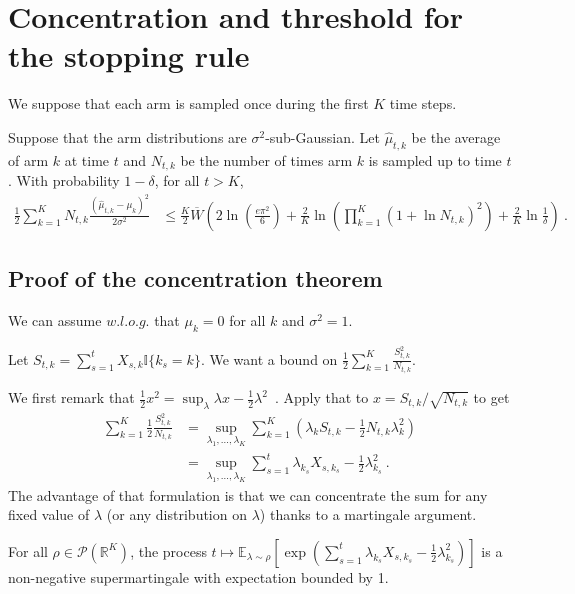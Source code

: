 

\section{Concentration and threshold for the stopping rule}
\label{app:concentration}

We suppose that each arm is sampled once during the first $K$ time steps.
\begin{theorem}
  \label{thm:bound_delta}
  Suppose that the arm distributions are $\sigma^2$-sub-Gaussian. Let $\hat{\mu}_{t,k}$ be the average of arm $k$ at time $t$ and $N_{t,k}$ be the number of times arm $k$ is sampled up to time $t$.
  With probability $1 - \delta$, for all $t > K$,
  \begin{align*}
  \frac{1}{2} \sum_{k=1}^K N_{t,k}\frac{(\hat{\mu}_{t,k}- \mu_k)^2}{2 \sigma^2}
  &\le \frac{K}{2} \overline{W}\left(2\ln \left(\frac{e\pi^2}{6}\right) + \frac{2}{K}\ln \left(\prod_{k=1}^K (1 + \ln N_{t,k})^2\right) + \frac{2}{K}\ln \frac{1}{\delta}\right)
  \: .
  \end{align*}
\end{theorem}



\subsection{Proof of the concentration theorem}

We can assume $w.l.o.g.$ that $\mu_k = 0$ for all $k$ and $\sigma^2 = 1$.

Let $S_{t,k} = \sum_{s=1}^t X_{s,k} \mathbb{I}\{k_s = k\}$.
We want a bound on $\frac{1}{2} \sum_{k=1}^K \frac{S_{t,k}^2}{N_{t,k}}$.


We first remark that $\frac{1}{2}x^2 = \sup_{\lambda} \lambda x - \frac{1}{2}\lambda^2$~. Apply that to $x = S_{t,k}/\sqrt{N_{t,k}}$ to get
\begin{align*}
\sum_{k=1}^K \frac{1}{2}\frac{S_{t,k}^2}{N_{t,k}}
&= \sup_{\lambda_1, \ldots, \lambda_K} \sum_{k=1}^K \left( \lambda_k S_{t,k} - \frac{1}{2}N_{t,k} \lambda_k^2 \right)
\\
&= \sup_{\lambda_1, \ldots, \lambda_K} \sum_{s=1}^t \lambda_{k_s}X_{s,k_s} - \frac{1}{2}\lambda_{k_s}^2
\: .
\end{align*}
The advantage of that formulation is that we can concentrate the sum for any fixed value of $\lambda$ (or any distribution on $\lambda$) thanks to a martingale argument.

\begin{lemma}
For all $\rho \in \mathcal P(\mathbb{R}^K)$, the process $t \mapsto \mathbb{E}_{\lambda \sim \rho}\left[\exp\left(\sum_{s=1}^t \lambda_{k_s}X_{s,k_s} - \frac{1}{2}\lambda_{k_s}^2\right)\right]$ is a non-negative supermartingale with expectation bounded by 1.
\end{lemma}


